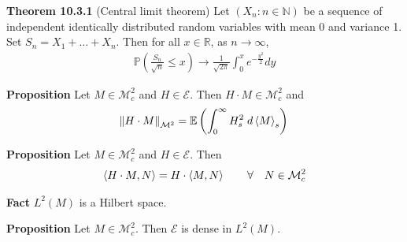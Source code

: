 \documentclass[hidelinks, 12pt]{article}
\theoremstyle{mydefstyle}
\theoremstyle{mythmstyle}
\begin{document}
\textbf{Theorem 10.3.1} (Central limit theorem) Let $(X_n : n \in \mathbb{N})$ be a sequence of independent identically distributed random variables with mean 0 and variance 1. Set $S_n = X_1 + \dots + X_n$. Then for all $x \in \mathbb{R}$, as $n \to \infty$,
\begin{gather*}
\mathbb{P} \left( \frac{S_n}{\sqrt{n}} \le x \right) \to \frac{1}{\sqrt{2\pi}} \int_0^x e^{-\frac{y^2}{2}} dy
\end{gather*}

\textbf{Proposition} Let $M \in \mathcal{M}^2_c$ and $H \in \mathcal{E}$. Then $H \cdot M \in \mathcal{M}^2_c$ and 
\begin{gather*}
\norm{H \cdot M}_{\mathcal{M}^2} = \mathbb{E} \left( \int_0^{\infty} H_s^2 \hspace{1mm} d\braket{M}_s \right)
\end{gather*}

\textbf{Proposition} Let $M \in \mathcal{M}^2_c$ and $H \in \mathcal{E}$. Then
\begin{gather*}
\braket{H \cdot M, N} = H \cdot \braket{M, N} \qquad \forall \quad N \in \mathcal{M}^2_c
\end{gather*}

\textbf{Fact} $L^2(M)$ is a Hilbert space.

\textbf{Proposition} Let $M \in \mathcal{M}^2_c$. Then $\mathcal{E}$ is dense in $L^2(M)$.
\end{document}
